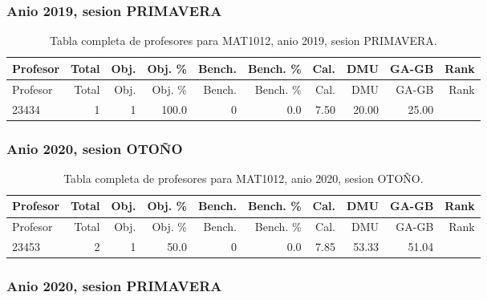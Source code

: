 \endgroup

\subsubsection{Anio 2019, sesion PRIMAVERA}

\begingroup
\scriptsize
\setlength{\tabcolsep}{3pt}
\begin{longtable}{lrrrrrrrrr}
\caption{Tabla completa de profesores para MAT1012, anio 2019, sesion PRIMAVERA.}\label{tab:prof-period-mat1012-2019-primavera-especializado}\\
\toprule
Profesor & Total & Obj. & Obj. \% & Bench. & Bench. \% & Cal. & DMU & GA-GB & Rank \\
\midrule
\endfirsthead
\toprule
Profesor & Total & Obj. & Obj. \% & Bench. & Bench. \% & Cal. & DMU & GA-GB & Rank \\
\midrule
\endhead
23434 & 1 & 1 & 100.0 & 0 & 0.0 & 7.50 & 20.00 & 25.00 &  \\
\bottomrule
\end{longtable}
\endgroup

\subsubsection{Anio 2020, sesion OTOÑO}

\begingroup
\scriptsize
\setlength{\tabcolsep}{3pt}
\begin{longtable}{lrrrrrrrrr}
\caption{Tabla completa de profesores para MAT1012, anio 2020, sesion OTOÑO.}\label{tab:prof-period-mat1012-2020-oto-o-especializado}\\
\toprule
Profesor & Total & Obj. & Obj. \% & Bench. & Bench. \% & Cal. & DMU & GA-GB & Rank \\
\midrule
\endfirsthead
\toprule
Profesor & Total & Obj. & Obj. \% & Bench. & Bench. \% & Cal. & DMU & GA-GB & Rank \\
\midrule
\endhead
23453 & 2 & 1 & 50.0 & 0 & 0.0 & 7.85 & 53.33 & 51.04 &  \\
\bottomrule
\end{longtable}
\endgroup

\subsubsection{Anio 2020, sesion PRIMAVERA}

